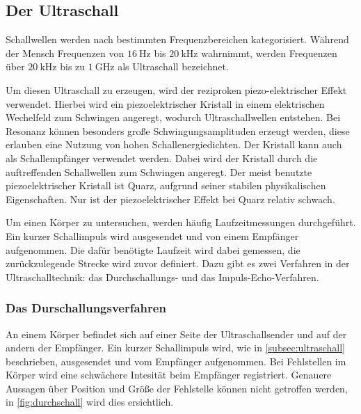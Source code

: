 \subsection{Der Ultraschall}
\label{subsec:ultraschall}

Schallwellen werden nach bestimmten Frequenzbereichen kategorisiert.
Während der Mensch Frequenzen von $\SI{16}{\hertz}$ bis $\SI{20}{\kilo\hertz}$ wahrnimmt, 
werden Frequenzen über $\SI{20}{\kilo\hertz}$ bis zu $\SI{1}{\giga\hertz}$ als Ultraschall bezeichnet.

\noindent
Um diesen Ultraschall zu erzeugen, wird der reziproken piezo-elektrischer Effekt verwendet.
Hierbei wird ein piezoelektrischer Kristall in einem elektrischen Wechelfeld zum Schwingen angeregt, wodurch Ultraschallwellen entstehen.
Bei Resonanz können besonders große Schwingungsamplituden erzeugt werden, diese erlauben eine Nutzung von hohen Schallenergiedichten.
Der Kristall kann auch als Schallempfänger verwendet werden. Dabei wird der Kristall durch die auftreffenden Schallwellen zum Schwingen angeregt.
Der meist benutzte piezoelektrischer Kristall ist Quarz, aufgrund seiner stabilen physikalischen Eigenschaften.
Nur ist der piezoelektrischer Effekt bei Quarz relativ schwach.

\noindent
Um einen Körper zu untersuchen, werden häufig Laufzeitmessungen durchgeführt.
Ein kurzer Schallimpuls wird ausgesendet und von einem Empfänger aufgenommen.
Die dafür benötigte Laufzeit wird dabei gemessen,  die zurückzulegende Strecke wird zuvor definiert.
Dazu gibt es zwei Verfahren in der Ultraschalltechnik: das Durchschallungs- und das Impuls-Echo-Verfahren.

\subsubsection{Das Durschallungsverfahren}
\label{subsubsec:durchschall}
An einem Körper befindet sich auf einer Seite der Ultraschallsender und auf der andern der Empfänger.
Ein kurzer Schallimpuls wird, wie in \autoref{subsec:ultraschall} beschrieben, ausgesendet und vom Empfänger aufgenommen.
Bei Fehlstellen im Körper wird eine schwächere Intesität beim Empfänger registriert.
Genauere Aussagen über Position und Größe der Fehlstelle können nicht getroffen werden, in \autoref{fig:durchschall} wird dies ersichtlich.

